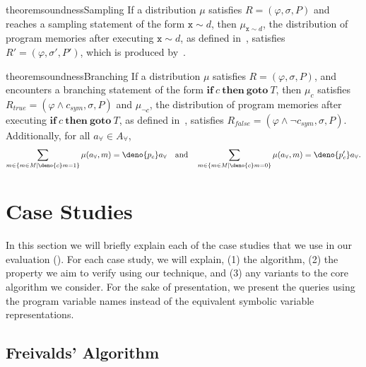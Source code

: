 \documentclass[acmsmall,review,anonymous]{acmart}\settopmatter{printfolios=true,printccs=false,printacmref=false}
\begin{document}
\begin{restatable}{theorem}{soundnessSampling}
  If a distribution $\mu$ satisfies $R = (\varphi,\sigma,P)$ and~ reaches a sampling statement of the form $\mathtt{x} \sim d$, then $\mu_{\mathtt{x} \sim d}$, the distribution of program memories after executing $\mathtt{x} \sim d$, as defined in~, satisfies $R'=(\varphi,\sigma',P')$, which is produced by~.
\end{restatable}

\begin{restatable}{theorem}{soundnessBranching}\label{thm:branch}
  If a distribution $\mu$ satisfies $R=(\varphi,\sigma,P)$, and~ encounters a branching statement of the form $\mathbf{if}~c~\mathbf{then~goto}~T$, then $\mu_c$ satisfies $R_{true} = (\varphi \wedge c_{sym}, \sigma, P)$ and $\mu_{\neg c}$, the distribution of program memories after executing $\mathbf{if}~c~\mathbf{then~goto}~T$, as defined in~, satisfies $R_{false} = (\varphi \wedge \neg c_{sym}, \sigma, P)$. Additionally, for all $a_{\forall} \in \mathit{A}_{\forall}$,
  \[
    \sum_{m \in \{m \in \mathit{M} \mid \deno{c}m = 1\}}\mu(a_{\forall},m) = \deno{p_c} a_{\forall}\quad\text{and}\quad\sum_{m \in \{m \in \mathit{M} \mid \deno{c}m = 0\}}\mu(a_{\forall},m) = \deno{p_c'} a_{\forall}.
  \]
\end{restatable}


\section{Case Studies}
\label{sec:case_studies}
In this section we will briefly explain each of the case studies that we use in our evaluation ().
% 
For each case study, we will explain, (1) the algorithm, (2) the property we aim to verify using our technique, and (3) any variants to the core algorithm we consider.
% 
For the sake of presentation, we present the queries using the program variable names instead of the equivalent symbolic variable representations.


\subsection{Freivalds' Algorithm}
\label{sec:freivalds}
\end{document}
